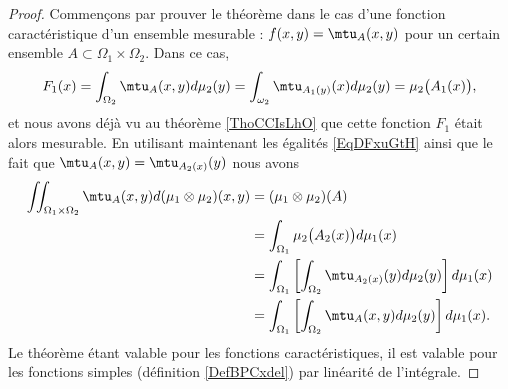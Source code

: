 \begin{proof}
    Commençons par prouver le théorème dans le cas d'une fonction caractéristique d'un ensemble mesurable : \( f(x,y)=\mtu_{A}(x,y)\) pour un certain ensemble \( A\subset \Omega_1\times \Omega_2\). Dans ce cas,
    \begin{equation}
        F_1(x)=\int_{\Omega_2}\mtu_A(x,y)d\mu_2(y)=\int_{\omega_2}\mtu_{A_1(y)}(x)d\mu_2(y)=\mu_2\big( A_1(x) \big),
    \end{equation}
    et nous avons déjà vu au théorème \ref{ThoCCIsLhO} que cette fonction \( F_1\) était alors mesurable. En utilisant maintenant les égalités \eqref{EqDFxuGtH} ainsi que le fait que \( \mtu_A(x,y)=\mtu_{A_2(x)}(y)\) nous avons
    \begin{subequations}
        \begin{align}
            \iint_{\Omega_1\times \Omega_2}\mtu_A(x,y)d(\mu_1\otimes \mu_2)(x,y)&=(\mu_1\otimes \mu_2)(A)\\
            &=\int_{\Omega_1}\mu_2\big( A_2(x) \big)d\mu_1(x)\\
            &=\int_{\Omega_1}\left[   \int_{\Omega_2}\mtu_{A_2(x)}(y)d\mu_2(y)  \right]d\mu_1(x)\\
            &=\int_{\Omega_1}\left[ \int_{\Omega_2}\mtu_A(x,y)d\mu_2(y) \right]d\mu_1(x).
        \end{align}
    \end{subequations}
    Le théorème étant valable pour les fonctions caractéristiques, il est valable pour les fonctions simples (définition \ref{DefBPCxdel}) par linéarité de l'intégrale.


\end{proof}
